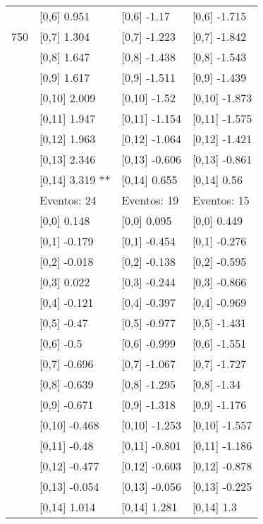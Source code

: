 \begin{table}
\begin{tabular}[t]{llll}
 & {}[0,6] 0.951 & {}[0,6] -1.17 & {}[0,6] -1.715\\
750 & {}[0,7] 1.304 & {}[0,7] -1.223 & {}[0,7] -1.842\\
\addlinespace
 & {}[0,8] 1.647 & {}[0,8] -1.438 & {}[0,8] -1.543\\
 & {}[0,9] 1.617 & {}[0,9] -1.511 & {}[0,9] -1.439\\
 & {}[0,10] 2.009 & {}[0,10] -1.52 & {}[0,10] -1.873\\
 & {}[0,11] 1.947 & {}[0,11] -1.154 & {}[0,11] -1.575\\
 & {}[0,12] 1.963 & {}[0,12] -1.064 & {}[0,12] -1.421\\
\addlinespace
 & {}[0,13] 2.346 & {}[0,13] -0.606 & {}[0,13] -0.861\\
 & {}[0,14] 3.319 ** & {}[0,14] 0.655 & {}[0,14] 0.56\\
 & Eventos:  24 & Eventos:  19 & Eventos:  15\\
 & {}[0,0] 0.148 & {}[0,0] 0.095 & {}[0,0] 0.449\\
 & {}[0,1] -0.179 & {}[0,1] -0.454 & {}[0,1] -0.276\\
\addlinespace
 & {}[0,2] -0.018 & {}[0,2] -0.138 & {}[0,2] -0.595\\
 & {}[0,3] 0.022 & {}[0,3] -0.244 & {}[0,3] -0.866\\
 & {}[0,4] -0.121 & {}[0,4] -0.397 & {}[0,4] -0.969\\
 & {}[0,5] -0.47 & {}[0,5] -0.977 & {}[0,5] -1.431\\
 & {}[0,6] -0.5 & {}[0,6] -0.999 & {}[0,6] -1.551\\
\addlinespace
1000 & {}[0,7] -0.696 & {}[0,7] -1.067 & {}[0,7] -1.727\\
 & {}[0,8] -0.639 & {}[0,8] -1.295 & {}[0,8] -1.34\\
 & {}[0,9] -0.671 & {}[0,9] -1.318 & {}[0,9] -1.176\\
 & {}[0,10] -0.468 & {}[0,10] -1.253 & {}[0,10] -1.557\\
 & {}[0,11] -0.48 & {}[0,11] -0.801 & {}[0,11] -1.186\\
\addlinespace
 & {}[0,12] -0.477 & {}[0,12] -0.603 & {}[0,12] -0.878\\
 & {}[0,13] -0.054 & {}[0,13] -0.056 & {}[0,13] -0.225\\
 & {}[0,14] 1.014 & {}[0,14] 1.281 & {}[0,14] 1.3\\
\bottomrule
\end{tabular}
\end{table}
